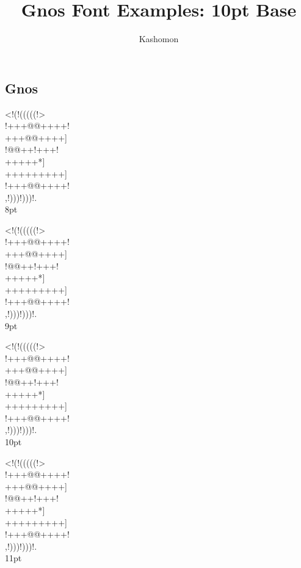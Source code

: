\documentclass[10pt]{article}
\begin{document}
\title{Gnos Font Examples: 10pt Base}
\author{Kashomon}
\maketitle

\begin{center}
\section*{Gnos}
{
\gnos%
<!(!(((((!>\\
!+++@@++++!\\
+++@@++++]\\
!@@++!+++!\\
+++++*]\\
+++++++++]\\
!+++@@++++!\\
,!)))!)))!.\\
}
8pt

{
\gnos%
<!(!(((((!>\\
!+++@@++++!\\
+++@@++++]\\
!@@++!+++!\\
+++++*]\\
+++++++++]\\
!+++@@++++!\\
,!)))!)))!.\\
}
9pt


{
\gnos%
<!(!(((((!>\\
!+++@@++++!\\
+++@@++++]\\
!@@++!+++!\\
+++++*]\\
+++++++++]\\
!+++@@++++!\\
,!)))!)))!.\\
}
10pt

\newpage

{
\gnos%
<!(!(((((!>\\
!+++@@++++!\\
+++@@++++]\\
!@@++!+++!\\
+++++*]\\
+++++++++]\\
!+++@@++++!\\
,!)))!)))!.\\
}
11pt


\end{center}
\end{document}
